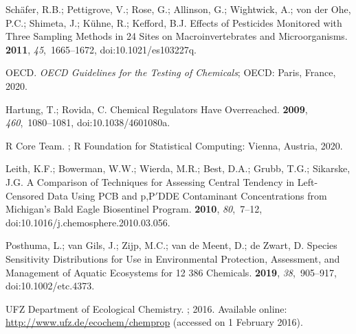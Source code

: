 \documentclass[data,datadescriptor,accept,moreauthors,pdftex]{Definitions/mdpi}
\begin{document}
\begin{thebibliography}{999}
Sch{\"a}fer, R.B.; Pettigrove, V.; Rose, G.; Allinson, G.; Wightwick, A.; {von
  der Ohe}, P.C.; Shimeta, J.; K{\"u}hne, R.; Kefford, B.J.
\newblock Effects of {{Pesticides Monitored}} with {{Three Sampling Methods}}
  in 24 {{Sites}} on {{Macroinvertebrates}} and {{Microorganisms}}.
 {\bf 2011}, {\em
  45},~1665--1672, doi:10.1021/es103227q.

OECD.
\newblock \emph{{{OECD Guidelines}} for the {{Testing}} of {{Chemicals}}}; OECD: Paris, France, 2020.

Hartung, T.; Rovida, C.
\newblock Chemical Regulators Have Overreached.
 {\bf 2009}, {\em 460},~1080--1081, doi:10.1038/4601080a.

{R Core Team}.
; {R Foundation for Statistical Computing}: {Vienna, Austria},
  2020.

Leith, K.F.; Bowerman, W.W.; Wierda, M.R.; Best, D.A.; Grubb, T.G.; Sikarske,
  J.G.
\newblock A Comparison of Techniques for Assessing Central Tendency in
  Left-Censored Data Using {{PCB}} and p,P{${'}$}{{DDE}} Contaminant
  Concentrations from {{Michigan}}'s {{Bald Eagle Biosentinel Program}}.
 {\bf 2010}, {\em 80},~7--12, doi:10.1016/j.chemosphere.2010.03.056.

Posthuma, L.; {van Gils}, J.; Zijp, M.C.; {van de Meent}, D.; {de Zwart}, D.
\newblock Species Sensitivity Distributions for Use in Environmental
  Protection, Assessment, and Management of Aquatic Ecosystems for 12 386
  Chemicals.
 {\bf 2019}, {\em
  38},~905--917, doi:10.1002/etc.4373.

{UFZ Department of Ecological Chemistry}.
; 2016.
\newblock Available online: \url{http://www.ufz.de/ecochem/chemprop}
\newblock (accessed on 1 February 2016).


\end{thebibliography}
\end{document}
